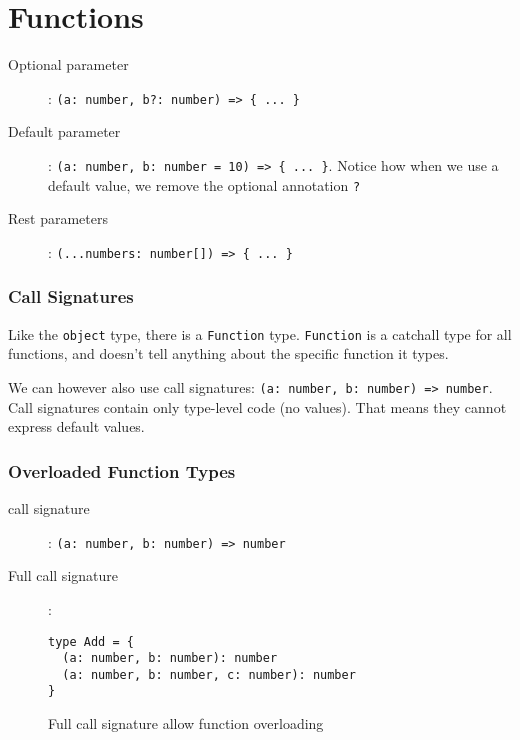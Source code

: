 \documentclass[french]{article}
\begin{document}
\section{Functions}

\begin{description}
  \item[Optional parameter]: \lstinline|(a: number, b?: number) => { ... }|
  \item[Default parameter]: \lstinline|(a: number, b: number = 10) => { ... }|. Notice how when we use a default value, we remove the optional annotation \lstinline{?}
  \item[Rest parameters]: \lstinline|(...numbers: number[]) => { ... }|
\end{description}

\subsubsection{Call Signatures}

Like the \lstinline{object} type, there is a \lstinline{Function} type. \lstinline{Function} is a catchall type for all functions, and doesn't tell anything about the specific function it types.

We can however also use call signatures: \lstinline{(a: number, b: number) => number}. Call signatures contain only type-level code (no values). That means they cannot express default values.

\subsubsection{Overloaded Function Types}

\begin{description}
  \item[call signature]: \lstinline{(a: number, b: number) => number}
  \item[Full call signature]:
    \begin{lstlisting}
type Add = {
  (a: number, b: number): number
  (a: number, b: number, c: number): number
}
    \end{lstlisting}
    Full call signature allow function overloading
\end{description}
\end{document}
